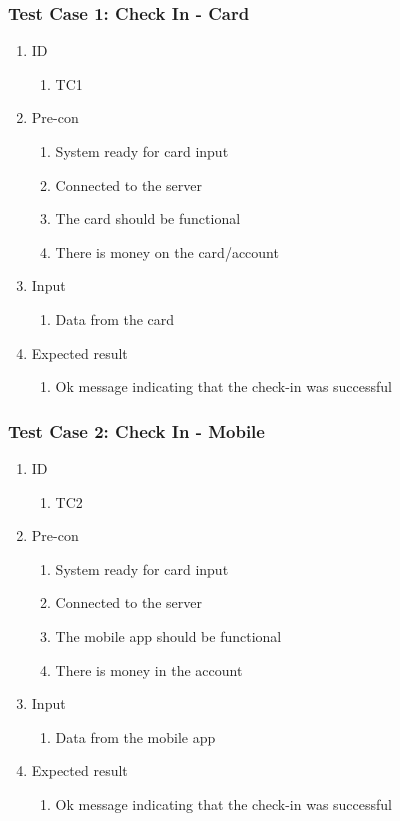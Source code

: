 \subsubsection*{Test Case 1: Check In - Card}
\begin{enumerate}
	\item ID
		\begin{enumerate}
			\item TC1
		\end{enumerate}
	\item Pre-con
		\begin{enumerate}
			\item System ready for card input
			\item Connected to the server
			\item The card should be functional
			\item There is money on the card/account
		\end{enumerate}
	\item Input
		\begin{enumerate}
			\item Data from the card
		\end{enumerate}
	\item Expected result
		\begin{enumerate}
			\item Ok message indicating that the check-in was successful 
		\end{enumerate}
\end{enumerate}


\subsubsection*{Test Case 2: Check In - Mobile}
\begin{enumerate}
	\item ID
		\begin{enumerate}
			\item TC2
		\end{enumerate}
	\item Pre-con
		\begin{enumerate}
			\item System ready for card input
			\item Connected to the server
			\item The mobile app should be functional
			\item There is money in the account
		\end{enumerate}
	\item Input
		\begin{enumerate}
			\item Data from the mobile app
		\end{enumerate}
	\item Expected result
		\begin{enumerate}
			\item Ok message indicating that the check-in was successful 
		\end{enumerate}
\end{enumerate}


